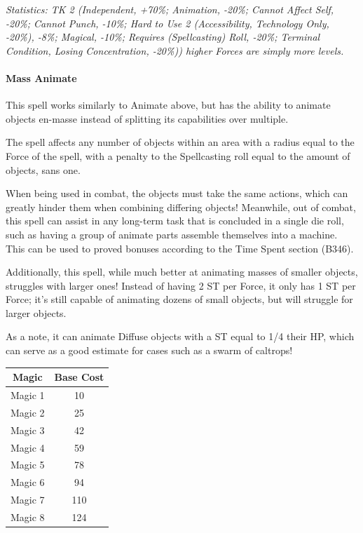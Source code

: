 \begin{multicols}{3}
	\textcolor{OliveGreen}{\textit{Statistics: TK 2 (Independent, +70\%; Animation, -20\%; Cannot Affect Self, -20\%; Cannot Punch, -10\%; Hard to Use 2 (Accessibility, Technology Only, -20\%), -8\%; Magical, -10\%; Requires (Spellcasting) Roll, -20\%; Terminal Condition, Losing Concentration, -20\%)) higher Forces are simply more levels.}}
	
	\paragraph{Mass Animate}
	
	This spell works similarly to Animate above, but has the ability to animate objects en-masse instead of splitting its capabilities over multiple.
	
	The spell affects any number of objects within an area with a radius equal to the Force of the spell, with a penalty to the Spellcasting roll equal to the amount of objects, sans one. 
	
	When being used in combat, the objects must take the same actions, which can greatly hinder them when combining differing objects! Meanwhile, out of combat, this spell can assist in any long-term task that is concluded in a single die roll, such as having a group of animate parts assemble themselves into a machine. This can be used to proved bonuses according to the Time Spent section (B346).
	
	Additionally, this spell, while much better at animating masses of smaller objects, struggles with larger ones! Instead of having 2 ST per Force, it only has 1 ST per Force; it's still capable of animating dozens of small objects, but will struggle for larger objects.
	
	As a note, it can animate Diffuse objects with a ST equal to 1/4 their HP, which can serve as a good estimate for cases such as a swarm of caltrops!	
	
	\begin{center}
		\begin{tabular}{|c|c|}
			\hline
			Magic & Base Cost \\
			\hline
			\hline
			Magic 1 & 10 \\
			Magic 2 & 25 \\
			Magic 3 & 42 \\
			Magic 4 & 59 \\
			Magic 5 & 78 \\
			Magic 6 & 94 \\
			Magic 7 & 110 \\
			Magic 8 & 124 \\
			\hline
		\end{tabular}
	\end{center}



\end{multicols}
